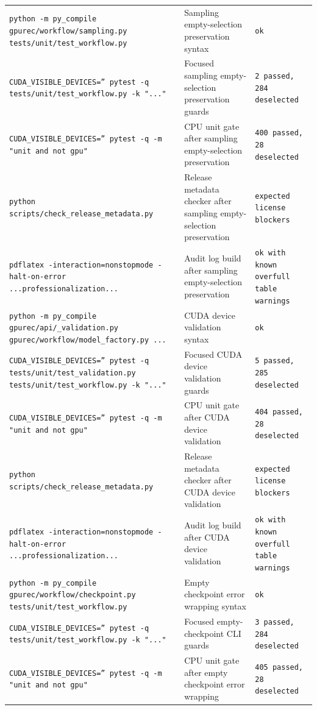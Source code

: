 \documentclass[11pt]{article}
\begin{document}
\begin{center}
\begin{tabular}{lll}
\texttt{python -m py\_compile gpurec/workflow/sampling.py tests/unit/test\_workflow.py} &
Sampling empty-selection preservation syntax &
\texttt{ok} \\
\texttt{CUDA\_VISIBLE\_DEVICES='' pytest -q tests/unit/test\_workflow.py -k "..."} &
Focused sampling empty-selection preservation guards &
\texttt{2 passed, 284 deselected} \\
\texttt{CUDA\_VISIBLE\_DEVICES='' pytest -q -m "unit and not gpu"} &
CPU unit gate after sampling empty-selection preservation &
\texttt{400 passed, 28 deselected} \\
\texttt{python scripts/check\_release\_metadata.py} &
Release metadata checker after sampling empty-selection preservation &
\texttt{expected license blockers} \\
\texttt{pdflatex -interaction=nonstopmode -halt-on-error ...professionalization...} &
Audit log build after sampling empty-selection preservation &
\texttt{ok with known overfull table warnings} \\
\texttt{python -m py\_compile gpurec/api/\_validation.py gpurec/workflow/model\_factory.py ...} &
CUDA device validation syntax &
\texttt{ok} \\
\texttt{CUDA\_VISIBLE\_DEVICES='' pytest -q tests/unit/test\_validation.py tests/unit/test\_workflow.py -k "..."} &
Focused CUDA device validation guards &
\texttt{5 passed, 285 deselected} \\
\texttt{CUDA\_VISIBLE\_DEVICES='' pytest -q -m "unit and not gpu"} &
CPU unit gate after CUDA device validation &
\texttt{404 passed, 28 deselected} \\
\texttt{python scripts/check\_release\_metadata.py} &
Release metadata checker after CUDA device validation &
\texttt{expected license blockers} \\
\texttt{pdflatex -interaction=nonstopmode -halt-on-error ...professionalization...} &
Audit log build after CUDA device validation &
\texttt{ok with known overfull table warnings} \\
\texttt{python -m py\_compile gpurec/workflow/checkpoint.py tests/unit/test\_workflow.py} &
Empty checkpoint error wrapping syntax &
\texttt{ok} \\
\texttt{CUDA\_VISIBLE\_DEVICES='' pytest -q tests/unit/test\_workflow.py -k "..."} &
Focused empty-checkpoint CLI guards &
\texttt{3 passed, 284 deselected} \\
\texttt{CUDA\_VISIBLE\_DEVICES='' pytest -q -m "unit and not gpu"} &
CPU unit gate after empty checkpoint error wrapping &
\texttt{405 passed, 28 deselected} \\

\end{tabular}
\end{center}
\end{document}
